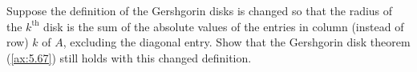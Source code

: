 \begin{exc}
\begin{exercise}
Suppose the definition of the Gershgorin disks is changed so that the radius of
the $k^{\text{th}}$ disk is the sum of the absolute values of the entries in
column (instead of row) $k$ of $A$, excluding the diagonal entry. Show that the
Gershgorin disk theorem (\ref{ax:5.67}) still holds with this changed definition.
\end{exercise}
\end{exc}
